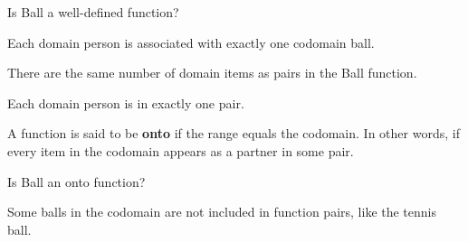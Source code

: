 \documentclass{ximera}
\begin{document}
\begin{exercise}
Is Ball a well-defined function?
  \begin{multipleChoice}
  \end{multipleChoice}
  \begin{feedback}
Each domain person is associated with exactly one codomain ball.
  \end{feedback}
\end{exercise}






\begin{exercise}
There are the same number of domain items as pairs in the Ball function.
  \begin{multipleChoice}
  \end{multipleChoice}
  \begin{feedback}
Each domain person is in exactly one pair.
  \end{feedback}
\end{exercise}






\begin{definition}
  A function is said to be \textbf{onto} if the range equals the codomain. In other words, if every item in the codomain appears as a partner in some pair.   
  
\end{definition}



\begin{exercise}
 Is Ball an onto function?
  \begin{multipleChoice}
  \end{multipleChoice}
  \begin{feedback}
Some balls in the codomain are not included in function pairs, like the tennis ball.
  \end{feedback}
\end{exercise}
\end{document}
